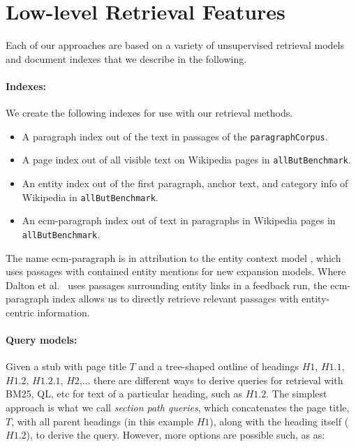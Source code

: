 \documentclass{article}
\begin{document}
\section{Low-level Retrieval Features}
\label{sec:low-level}

Each of our approaches are based on a variety of unsupervised retrieval models and document indexes that we describe in the following.

\paragraph{Indexes:}

We create the following indexes for use with our retrieval methods. 
\begin{itemize}
    \item A paragraph index out of the text in passages of the \texttt{paragraphCorpus}.
    \item A page index out of all visible text on Wikipedia pages in \texttt{allButBenchmark}. 
    \item An entity index out of the first paragraph, anchor text, and category info of Wikipedia in \texttt{allButBenchmark}.
    \item An ecm-paragraph index out of text in paragraphs in Wikipedia pages in \texttt{allButBenchmark}.
\end{itemize}

The name ecm-paragraph is in attribution to the entity context model \cite{dalton2014entity}, which uses passages with contained entity mentions for new expansion models. Where Dalton et al.\ \cite{dalton2014entity} uses passages surrounding entity links in a feedback run, the ecm-paragraph index allows us to directly retrieve relevant passages with entity-centric information.

\paragraph{Query models:}
Given a stub with page title $T$ and a tree-shaped outline of headings $H1$, $H1.1$, $H1.2$, $H1.2.1$, $H2$,... there are different ways to derive queries for retrieval with BM25, QL, etc for text of a particular heading, such as $H1.2$. The simplest approach is what we call \textit{section path queries}, which concatenates the page title, $T$, with all parent headings (in this example $H1$), along with the heading itself ($H1.2$), to derive the query. However, more options are possible such, as as:
\end{document}
